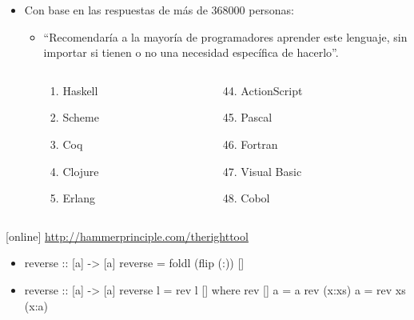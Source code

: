 \documentclass[spanish]{beamer}
\begin{document}
\begin{frame}
  \begin{itemize}
  \item
    Con base en las respuestas de más de 368000 personas:
    \begin{itemize}
    \item
      ``Recomendaría a la mayoría de programadores aprender este
      lenguaje, sin importar si tienen o no una necesidad específica
      de hacerlo''.
      \begin{columns}[T]
        \begin{column}{3cm}
          \begin{enumerate}
          \item Haskell
          \item Scheme
          \item Coq
          \item Clojure
          \item Erlang
          \end{enumerate}
        \end{column}
        \begin{column}{3cm}
          \begin{enumerate}
          \setcounter{enumi}{43}
          \item ActionScript
          \item Pascal
          \item Fortran
          \item Visual Basic
          \item Cobol
          \end{enumerate}
        \end{column}
      \end{columns}
    \end{itemize}
  \end{itemize}
  \begin{thebibliography}{}
  [online]
    \newblock \url{http://hammerprinciple.com/therighttool}
  \end{thebibliography}
\end{frame}



\begin{frame}[fragile]
  \begin{itemize}
  \item
    \begin{code}
reverse :: [a] -> [a]
reverse =  foldl (flip (:)) []
    \end{code}
  \item
    \begin{code}
reverse :: [a] -> [a]
reverse l = rev l []
  where
    rev []     a = a
    rev (x:xs) a = rev xs (x:a)
    \end{code}
  \end{itemize}
\end{frame}

\end{document}
